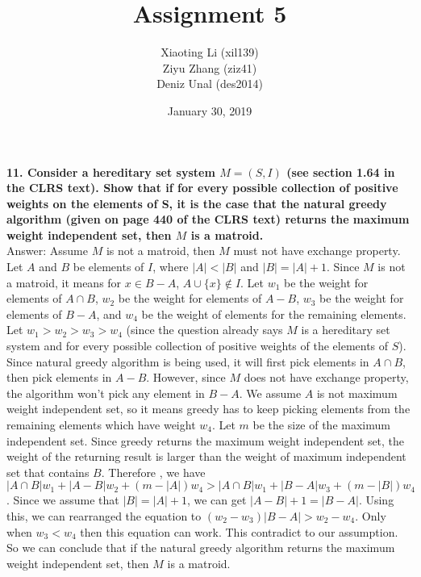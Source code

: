 \documentclass{article}
\title{Assignment 5}
\author{Xiaoting Li (xil139) \\
Ziyu Zhang (ziz41) \\
Deniz Unal (des2014)}
\date{January 30, 2019}
\begin{document}
\maketitle

\noindent
\textbf{11. Consider a hereditary set system $M = (S, I)$ (see section 1.64 in the CLRS text). Show that if for every possible collection of positive weights on the elements of S, it is the case that the natural greedy algorithm (given on page 440 of the CLRS text) returns the maximum weight independent set, then $M$ is a matroid.} \\ \newline
\noindent
Answer:
Assume $M$ is not a matroid, then $M$ must not have exchange property. Let $A$ and $B$ be elements of $I$, where $|A| < |B|$ and $|B| = |A| + 1$. Since $M$ is not a matroid, it means for $x \in B - A$, $A \cup \{x\} \notin I$. Let $w_1$ be the weight for elements of $A \cap B$, $w_2$ be the weight for elements of $A - B$, $w_3$ be the weight for elements of $B - A$, and $w_4$ be the weight of elements for the remaining elements. Let $w_1 > w_2 > w_3 > w_4$ (since the question already says $M$ is a hereditary set system and for every possible collection of positive weights of the elements of $S$). \\ \newline
\noindent
Since natural greedy algorithm is being used, it will first pick elements in $A \cap B$, then pick elements in $A - B$. However, since $M$ does not have exchange property, the algorithm won't pick any element in $B - A$. We assume $A$ is not maximum weight independent set, so it means greedy has to keep picking elements from the remaining elements which have weight $w_4$. Let $m$ be the size of the maximum independent set. Since greedy returns the maximum weight independent set, the weight of the returning result is larger than the weight of maximum independent set that contains $B$. Therefore , we have $|A \cap B|w_1 + |A - B|w_2 + (m - |A|)w_4 > |A \cap B|w_1 + |B - A|w_3 + (m - |B|)w_4$. Since we assume that $|B| = |A| + 1$, we can get $|A - B| + 1 = |B - A|$. Using this, we can rearranged the equation to $(w_2 - w_3)|B - A| > w_2 - w_4$. Only when $w_3 < w_4$ then this equation can work. This contradict to our assumption. So we can conclude that if the natural greedy algorithm returns the maximum weight independent set, then $M$ is a matroid.
\end{document}
